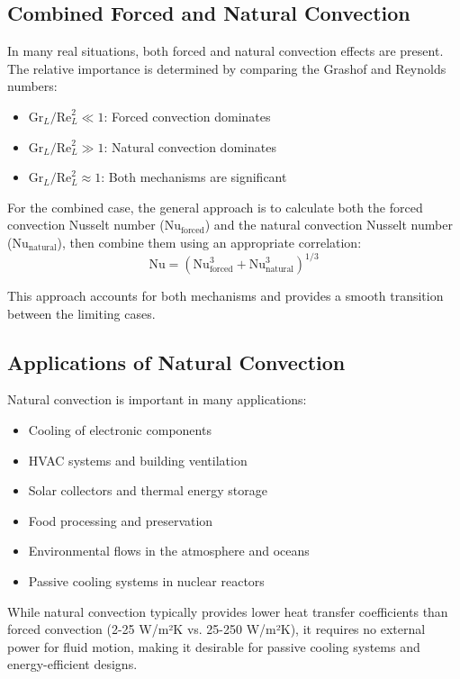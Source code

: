 \subsection*{Combined Forced and Natural Convection}
In many real situations, both forced and natural convection effects are present. The relative importance is determined by comparing the Grashof and Reynolds numbers:

\begin{itemize}
    \item $\text{Gr}_L/\text{Re}_L^2 \ll 1$: Forced convection dominates
    \item $\text{Gr}_L/\text{Re}_L^2 \gg 1$: Natural convection dominates
    \item $\text{Gr}_L/\text{Re}_L^2 \approx 1$: Both mechanisms are significant
\end{itemize}

For the combined case, the general approach is to calculate both the forced convection Nusselt number ($\text{Nu}_{\text{forced}}$) and the natural convection Nusselt number ($\text{Nu}_{\text{natural}}$), then combine them using an appropriate correlation:
\[
\text{Nu} = (\text{Nu}_{\text{forced}}^3 + \text{Nu}_{\text{natural}}^3)^{1/3}
\]

This approach accounts for both mechanisms and provides a smooth transition between the limiting cases.

\subsection*{Applications of Natural Convection}

Natural convection is important in many applications:
\begin{itemize}
    \item Cooling of electronic components
    \item HVAC systems and building ventilation
    \item Solar collectors and thermal energy storage
    \item Food processing and preservation
    \item Environmental flows in the atmosphere and oceans
    \item Passive cooling systems in nuclear reactors
\end{itemize}

While natural convection typically provides lower heat transfer coefficients than forced convection (2-25 W/m²K vs. 25-250 W/m²K), it requires no external power for fluid motion, making it desirable for passive cooling systems and energy-efficient designs.